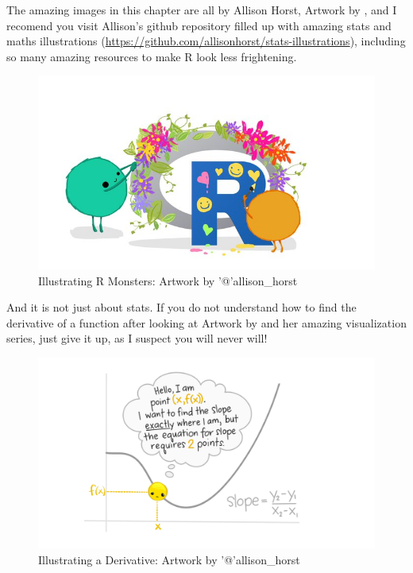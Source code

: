 \documentclass[
]{book}
\begin{document}
The amazing images in this chapter are all by Allison Horst, Artwork by \citet{allison_horst}, and I recomend you visit Allison's github repository filled up with amazing stats and maths illustrations (\url{https://github.com/allisonhorst/stats-illustrations}), including so many amazing resources to make R look less frightening.

\begin{figure}
\centering
\includegraphics{extfiles/monsteRs.jpg}
\caption{Illustrating R Monsters: Artwork by '@'allison\_horst}
\end{figure}

And it is not just about stats. If you do not understand how to find the derivative of a function after looking at Artwork by \citet{allison_horst} and her amazing visualization series, just give it up, as I suspect you will never will!

\begin{figure}
\centering
\includegraphics{extfiles/derivative_1.jpg}
\caption{Illustrating a Derivative: Artwork by '@'allison\_horst}
\end{figure}
\end{document}

